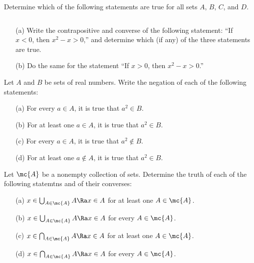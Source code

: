 
\begin{exercise}
	Determine which of the following statements are true for all 
	sets $A$, $B$, $C$, and $D$.
\end{exercise}


\begin{exercise}
	$ $
	\begin{enumerate}
		\item[(a)] Write the contrapositive and converse of the 
		following statement: ``If $x < 0$, then $x^2 - x > 0$,'' 
		and determine which (if any) of the three statements are 
		true.
		
		\item[(b)] Do the same for the statement ``If $x > 0$, then 
		$x^2 - x > 0$.''
	\end{enumerate}
\end{exercise}


\begin{exercise}
	Let $A$ and $B$ be sets of real numbers. Write the negation of 
	each of the following statements:
	\begin{enumerate}
		\item[(a)] For every $a \in A$, it is true that $a^2 \in B$.
		
		\item[(b)] For at least one $a \in A$, it is true that $a^2 
		\in B$.
		
		\item[(c)] For every $a \in A$, it is true that $a^2 \notin 
		B$.
		
		\item[(d)] For at least one $a \notin A$, it is true that 
		$a^2 \in B$.
	\end{enumerate}
\end{exercise}


\begin{exercise}
	Let $\mc{A}$ be a nonempty collection of sets. Determine the 
	truth of each of the following statemtns and of their converses:
	\begin{enumerate}
		\item[(a)] $x \in \bigcup_{A \in \mc{A}} A \Ra x \in A$ for 
		at least one $A \in \mc{A}$.
		
		\item[(b)] $x \in \bigcup_{A \in \mc{A}} A \Ra x \in A$ for 
		every $A \in \mc{A}$.
		
		\item[(c)] $x \in \bigcap_{A \in \mc{A}} A \Ra x \in A$ for 
		at least one $A \in \mc{A}$.
		
		\item[(d)] $x \in \bigcap_{A \in \mc{A}} A \Ra x \in A$ for 
		every $A \in \mc{A}$.
	\end{enumerate}
\end{exercise}


